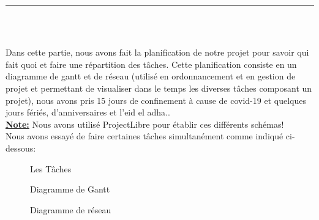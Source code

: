 \documentclass[12pt]{report}
\begin{document}
\newpage

\vspace*{-0.2in}

\begin{center}
    {\color{Blue} \rule{5.5in}{1.4mm} }\\
    \vspace{0.1in}
    \scshape{\fontsize{34}{46}{\bfseries{\color{Blue}{Planification}}}}
    \\
    \vspace{0.12in}
\end{center}
\hspace*{-0.05in}
Dans cette partie, nous avons fait la planification de notre projet pour savoir qui fait quoi et faire une répartition des tâches. Cette planification consiste en un diagramme de gantt et de réseau (utilisé en ordonnancement et en gestion de projet et permettant de visualiser dans le temps les diverses tâches composant un projet), nous avons pris 15 jours de confinement à cause de covid-19 et quelques jours fériés, d'anniversaires et l'eid el adha..
\\
\textbf{\underline{Note:}} Nous avons utilisé ProjectLibre pour établir ces différents schémas!
\\
Nous avons essayé de faire certaines tâches simultanément comme indiqué ci-dessous:

\vspace{0.15in}

\begin{figure}[h]
\centering
\caption{Les Tâches}
\end{figure}

\newpage

\begin{figure}[H]
\centering
\caption{Diagramme de Gantt}
\end{figure}

\newpage

\begin{figure}[H]
\centering
\caption{Diagramme de réseau}
\end{figure}
\end{document}
